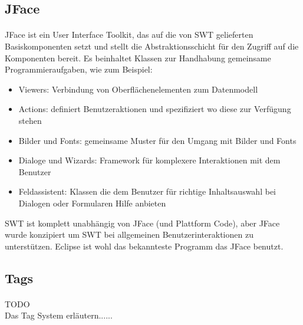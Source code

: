 \subsection{JFace}
\paragraph{}
JFace ist ein User Interface Toolkit, das auf die von SWT gelieferten Basiskomponenten setzt und stellt die Abstraktionsschicht für den Zugriff auf die Komponenten bereit. Es beinhaltet Klassen zur Handhabung gemeinsame Programmieraufgaben, wie zum Beispiel:


\begin{itemize}
\item Viewers: Verbindung von Oberflächenelementen zum Datenmodell
\item Actions: definiert Benutzeraktionen und spezifiziert wo diese zur Verfügung stehen
\item Bilder und Fonts: gemeinsame Muster für den Umgang mit Bilder und Fonts
\item Dialoge und Wizards: Framework für komplexere Interaktionen mit dem Benutzer
\item Feldassistent: Klassen die dem Benutzer für richtige Inhaltsauswahl bei Dialogen oder Formularen Hilfe anbieten
\end{itemize}


SWT ist komplett unabhängig von JFace (und Plattform Code), aber JFace wurde konzipiert um SWT  bei allgemeinen Benutzerinteraktionen zu unterstützen. Eclipse ist wohl das bekannteste Programm das JFace benutzt.\cite{EclipseHelp}\\



\subsection{Tags}
\paragraph{}
TODO\\
Das Tag System erläutern......